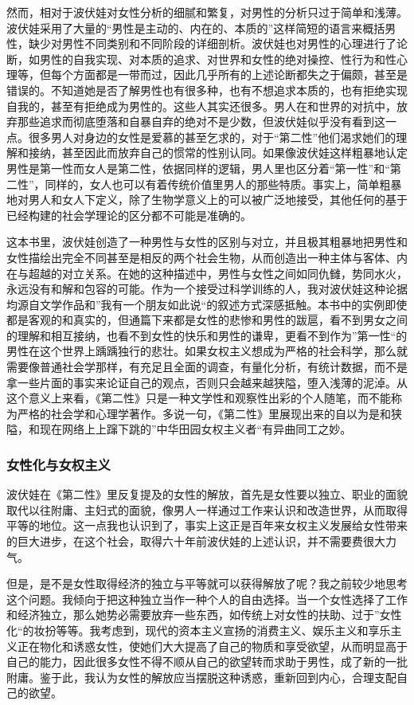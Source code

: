 然而，相对于波伏娃对女性分析的细腻和繁复，对男性的分析只过于简单和浅薄。波伏娃采用了大量的“男性是主动的、内在的、本质的”这样简短的语言来概括男性，缺少对男性不同类别和不同阶段的详细剖析。波伏娃也对男性的心理进行了论断，如男性的自我实现、对本质的追求、对世界和女性的绝对操控、性行为和性心理等，但每个方面都是一带而过，因此几乎所有的上述论断都失之于偏颇，甚至是错误的。不知道她是否了解男性也有很多种，也有不想追求本质的，也有拒绝实现自我的，甚至有拒绝成为男性的。这些人其实还很多。男人在和世界的对抗中，放弃那些追求而彻底堕落和自暴自弃的绝对不是少数，但波伏娃似乎没有看到这一点。很多男人对身边的女性是爱慕的甚至乞求的，对于“第二性”他们渴求她们的理解和接纳，甚至因此而放弃自己的惯常的性别认同。如果像波伏娃这样粗暴地认定男性是第一性而女人是第二性，依据同样的逻辑，男人里也区分着“第一性”和“第二性”，同样的，女人也可以有着传统价值里男人的那些特质。事实上，简单粗暴地对男人和女人下定义，除了生物学意义上的可以被广泛地接受，其他任何的基于已经构建的社会学理论的区分都不可能是准确的。

这本书里，波伏娃创造了一种男性与女性的区别与对立，并且极其粗暴地把男性和女性描绘出完全不同甚至是相反的两个社会生物，从而创造出一种主体与客体、内在与超越的对立关系。在她的这种描述中，男性与女性之间如同仇雠，势同水火，永远没有和解和包容的可能。作为一个接受过科学训练的人，我对波伏娃这种论据均源自文学作品和”我有一个朋友如此说“的叙述方式深感抵触。本书中的实例即使都是客观的和真实的，但通篇下来都是女性的悲惨和男性的跋扈，看不到男女之间的理解和相互接纳，也看不到女性的快乐和男性的谦卑，更看不到作为”第一性“的男性在这个世界上踽踽独行的悲壮。如果女权主义想成为严格的社会科学，那么就需要像普通社会学那样，有充足且全面的调查，有量化分析，有统计数据，而不是拿一些片面的事实来论证自己的观点，否则只会越来越狭隘，堕入浅薄的泥淖。从这个意义上来看，《第二性》只是一种文学性和观察性出彩的个人随笔，而不能称为严格的社会学和心理学著作。多说一句，《第二性》里展现出来的自以为是和狭隘，和现在网络上上蹿下跳的”中华田园女权主义者“有异曲同工之妙。

\subsubsection{女性化与女权主义}
波伏娃在《第二性》里反复提及的女性的解放，首先是女性要以独立、职业的面貌取代以往附庸、主妇式的面貌，像男人一样通过工作来认识和改造世界，从而取得平等的地位。这一点我也认识到了，事实上这正是百年来女权主义发展给女性带来的巨大进步，在这个社会，取得六十年前波伏娃的上述认识，并不需要费很大力气。

但是，是不是女性取得经济的独立与平等就可以获得解放了呢？我之前较少地思考这个问题。我倾向于把这种独立当作一种个人的自由选择。当一个女性选择了工作和经济独立，那么她势必需要放弃一些东西，如传统上对女性的扶助、过于”女性化“的妆扮等等。我考虑到，现代的资本主义宣扬的消费主义、娱乐主义和享乐主义正在物化和诱惑女性，使她们大大提高了自己的物质和享受欲望，从而明显高于自己的能力，因此很多女性不得不顺从自己的欲望转而求助于男性，成了新的一批附庸。鉴于此，我认为女性的解放应当摆脱这种诱惑，重新回到内心，合理支配自己的欲望。

